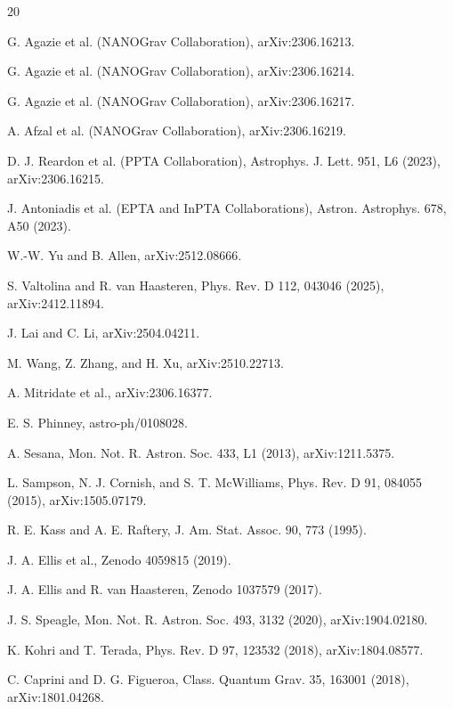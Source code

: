 \documentclass[aps,prl,reprint,superscriptaddress,nofootinbib,floatfix]{revtex4-2}
\begin{document}
\begin{thebibliography}{20}

G. Agazie et al. (NANOGrav Collaboration), arXiv:2306.16213.

G. Agazie et al. (NANOGrav Collaboration), arXiv:2306.16214.

G. Agazie et al. (NANOGrav Collaboration), arXiv:2306.16217.

A. Afzal et al. (NANOGrav Collaboration), arXiv:2306.16219.

D. J. Reardon et al. (PPTA Collaboration), Astrophys. J. Lett. 951,
L6 (2023), arXiv:2306.16215.

J. Antoniadis et al. (EPTA and InPTA Collaborations),
Astron. Astrophys. 678, A50 (2023).

W.-W. Yu and B. Allen, arXiv:2512.08666.

S. Valtolina and R. van Haasteren, Phys. Rev. D 112, 043046 (2025),
arXiv:2412.11894.

J. Lai and C. Li, arXiv:2504.04211.

M. Wang, Z. Zhang, and H. Xu, arXiv:2510.22713.

A. Mitridate et al., arXiv:2306.16377.

E. S. Phinney, astro-ph/0108028.

A. Sesana, Mon. Not. R. Astron. Soc. 433, L1 (2013),
arXiv:1211.5375.

L. Sampson, N. J. Cornish, and S. T. McWilliams, Phys. Rev. D 91,
084055 (2015), arXiv:1505.07179.

R. E. Kass and A. E. Raftery, J. Am. Stat. Assoc. 90, 773 (1995).

J. A. Ellis et al., Zenodo 4059815 (2019).

J. A. Ellis and R. van Haasteren, Zenodo 1037579 (2017).

J. S. Speagle, Mon. Not. R. Astron. Soc. 493, 3132 (2020),
arXiv:1904.02180.

K. Kohri and T. Terada, Phys. Rev. D 97, 123532 (2018),
arXiv:1804.08577.

C. Caprini and D. G. Figueroa, Class. Quantum Grav. 35, 163001 (2018),
arXiv:1801.04268.

\end{thebibliography}
\end{document}
